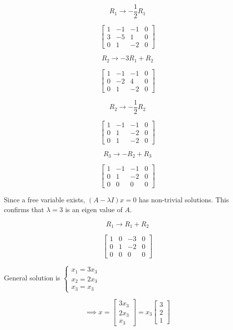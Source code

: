 \documentclass[12pt, a4paper]{article}
\begin{document}
\[
    R_1 \rightarrow -\frac{1}{2}R_1
\]

\[
    \begin{bmatrix}
        1 & -1 & -1 & 0 \\
        3 & -5 & 1 & 0 \\
        0 & 1 & -2 & 0
    \end{bmatrix}
\]

\[
    R_2 \rightarrow -3R_1 + R_2
\]

\[
    \begin{bmatrix}
        1 & -1 & -1 & 0 \\
        0 & -2 & 4 & 0 \\
        0 & 1 & -2 & 0
    \end{bmatrix}
\]

\newpage

\[
    R_2 \rightarrow -\frac{1}{2}R_2
\]

\[
    \begin{bmatrix}
        1 & -1 & -1 & 0 \\
        0 & 1 & -2 & 0 \\
        0 & 1 & -2 & 0
    \end{bmatrix}
\]

\[
    R_3 \rightarrow -R_2 + R_3
\]

\[
    \begin{bmatrix}
        1 & -1 & -1 & 0 \\
        0 & 1 & -2 & 0 \\
        0 & 0 & 0 & 0
    \end{bmatrix}
\]

Since a free variable exists, $(A - \lambda I)x = 0$ has non-trivial solutions. This confirms that $\lambda = 3$ is an eigen value of $A$.

\[
    R_1 \rightarrow R_1 + R_2
\]

\[
    \begin{bmatrix}
        1 & 0 & -3 & 0 \\
        0 & 1 & -2 & 0 \\
        0 & 0 & 0 & 0
    \end{bmatrix}
\]

General solution is $\begin{cases}
    x_1 = 3x_3 \\
    x_2 = 2x_3 \\
    x_3 = x_3
\end{cases}$

\[
    \implies x = \begin{bmatrix}
        3x_3 \\
        2x_3 \\
        x_3
    \end{bmatrix} = x_3 \begin{bmatrix}
        3 \\
        2 \\
        1
    \end{bmatrix}
\]
\end{document}
